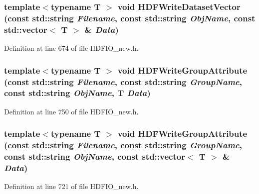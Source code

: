 \subsubsection[{HDFWriteDatasetVector}]{\setlength{\rightskip}{0pt plus 5cm}template$<$typename T $>$ void HDFWriteDatasetVector (const std::string {\em Filename}, \/  const std::string {\em ObjName}, \/  const std::vector$<$ T $>$ \& {\em Data})}\label{HDFIO__new_8h_a2beb19611043d3393a282ae7a2810075}


Definition at line 674 of file HDFIO\_\-new.h.

\subsubsection[{HDFWriteGroupAttribute}]{\setlength{\rightskip}{0pt plus 5cm}template$<$typename T $>$ void HDFWriteGroupAttribute (const std::string {\em Filename}, \/  const std::string {\em GroupName}, \/  const std::string {\em ObjName}, \/  T {\em Data})}\label{HDFIO__new_8h_a63d06b2c68f083f2a15b63f95b228a9b}


Definition at line 750 of file HDFIO\_\-new.h.

\subsubsection[{HDFWriteGroupAttribute}]{\setlength{\rightskip}{0pt plus 5cm}template$<$typename T $>$ void HDFWriteGroupAttribute (const std::string {\em Filename}, \/  const std::string {\em GroupName}, \/  const std::string {\em ObjName}, \/  const std::vector$<$ T $>$ \& {\em Data})}\label{HDFIO__new_8h_a93cc34de059a978c3b65e4a2fdd8bbc8}


Definition at line 721 of file HDFIO\_\-new.h.

